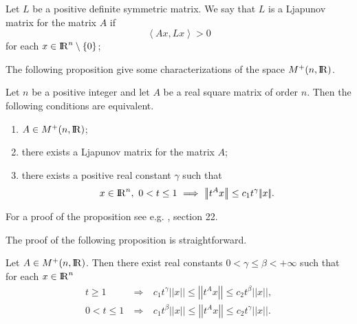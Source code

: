 \documentclass[12pt,a4paper]{amsart}
\begin{document}
Let ${L}$ be a positive definite symmetric matrix.
We say that ${L}$ is a Ljapunov matrix
for the matrix ${A}$ if
\begin{equation}\label{eq::Lyap}
	{\left<{{A}{x}},{{L}{x}}\right>}>0
\end{equation}
for each ${x}\in{{\rm I\kern-.185em R}}^{n}\setminus\{0\}$;

The following proposition give some characterizations
of the space ${{{M}^+}({n},{{\rm I\kern-.185em R}})}$.

\begin{proposition}\label{prop::PositiveMatrix}
Let ${n}$ be a positive integer and let ${A}$
be a real square matrix of order ${n}$.
Then the following conditions are equivalent.
\begin{enumerate}
	\item
		${A}\in{{{M}^+}({n},{{\rm I\kern-.185em R}})}$;
	\item
		there exists a Ljapunov matrix for the matrix ${A}$;
	\item
		there exists a positive real constant ${\gamma}$ such that
		\begin{equation}\nonumber
			{x}\in{{\rm I\kern-.185em R}}^{n},\ 0<{t}\leq1\ \Longrightarrow\ 
			{\left|\!\left|{{t}^{A}{x}}\right|\!\right|}\leq
			{c}_1{t}^{\gamma}{\left|\!\left|{x}\right|\!\right|}.
		\end{equation}	
\end{enumerate}
\end{proposition}

For a proof of the proposition see e.g.
\cite{book:ArnoldOrdDiffEqSpringer}, section 22.

The proof of the following proposition is straightforward.

\begin{proposition}\label{prop::PBaseEstimates}
Let ${A}\in{{{M}^+}({n},{{\rm I\kern-.185em R}})}$.
Then there exist real constants $0<{\gamma}\leq{\beta}<+\infty$
such that for each ${x}\in{{\rm I\kern-.185em R}}^{n}$
\begin{eqnarray}
	\label{eq::PBaseEstimatesOne}
	{t}\geq1&\ \Longrightarrow\ &
		{c}_1{t}^{\gamma}{\left|\!\left|{x}\right|\!\right|}
		\leq{\left|\!\left|{{t}^{A}{x}}\right|\!\right|}
		\leq{c}_2{t}^{\beta}{\left|\!\left|{x}\right|\!\right|},\\
	\label{eq::PBaseEstimatesTwo}
	0<{t}\leq1&\ \Longrightarrow\ &
		{c}_1{t}^{\beta}{\left|\!\left|{x}\right|\!\right|}
		\leq{\left|\!\left|{{t}^{A}{x}}\right|\!\right|}
		\leq{c}_2{t}^{\gamma}{\left|\!\left|{x}\right|\!\right|}.
\end{eqnarray}
\end{proposition}
\end{document}
